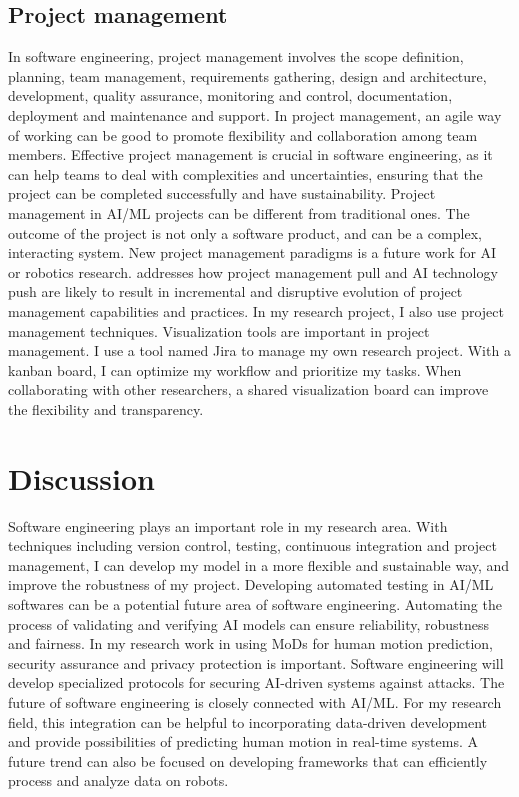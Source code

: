 \documentclass[11pt]{article}
\begin{document}
\subsection{Project management}
In software engineering, project management involves the scope definition, planning, team management, requirements gathering, design and architecture, development, quality assurance, monitoring and control, documentation, deployment and maintenance and support. In project management, an agile way of working can be good to promote flexibility and collaboration among team members. Effective project management is crucial in software engineering, as it can help teams to deal with complexities and uncertainties, ensuring that the project can be completed successfully and have sustainability. Project management in AI/ML projects can be different from traditional ones. The outcome of the project is not only a software product, and can be a complex, interacting system. New project management paradigms is a future work for AI or robotics research. \cite{projectmanagement} addresses how project management pull and AI technology push are likely to result in incremental and disruptive evolution of project management capabilities and practices. In my research project, I also use project management techniques. Visualization tools are important in project management.  I use a tool named Jira to manage my own research project. With a kanban board, I can optimize my workflow and prioritize my tasks. When collaborating with other researchers, a shared visualization board can improve the flexibility and transparency. 

\section{Discussion}

Software engineering plays an important role in my research area. With techniques including version control, testing, continuous integration and project management, I can develop my model in a more flexible and sustainable way, and improve the robustness of my project. Developing automated testing in AI/ML softwares can be a potential future area of software engineering. Automating the process of validating and verifying AI models can ensure reliability, robustness and fairness. In my research work in using MoDs for human motion prediction, security assurance and privacy protection is important. Software engineering will develop specialized protocols for securing AI-driven systems against attacks. The future of software engineering is closely connected with AI/ML. For my research field, this integration can be helpful to incorporating data-driven development and provide possibilities of predicting human motion in real-time systems. A future trend can also be focused on developing frameworks that can efficiently process and analyze data on robots.



\end{document}
